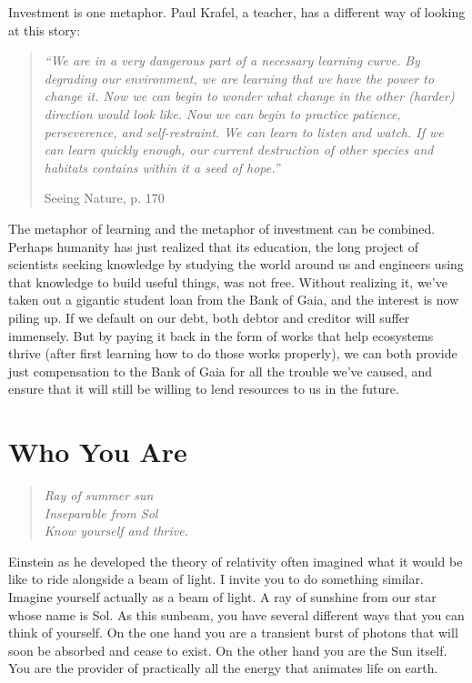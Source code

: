 \documentclass[ebook,11pt,openany,twoside]{memoir}
\newcommand{\tab}{\hspace*{2em}}
\newcommand{\imagefacingchapter}[1]{
  \cleartoverso
  \clearpage \null
  \thispagestyle{cleared}
  \AddToShipoutPictureBG*{%
    \AtStockLowerLeft{%
      \texttt{[image: \#1]}
    }
  }
  \clearpage
}
\begin{document}
Investment is one metaphor. Paul Krafel, a teacher, has a different way of
looking at this story:

\begin{quote}
	\em
	``We are in a very dangerous part of a necessary learning curve. By
degrading our environment, we are learning that we have the power to change it.
Now we can begin to wonder what change in the other (harder) direction would
look like. Now we can begin to practice patience, perseverence, and
self-restraint. We can learn to listen and watch. If we can learn quickly
enough, our current destruction of other species and habitats contains within
it a seed of hope.''

\tab \tab Seeing Nature, p. 170
\end{quote}

The metaphor of learning and the metaphor of investment can be combined.
Perhaps humanity has just realized that its education, the long project of
scientists seeking knowledge by studying the world around us and engineers
using that knowledge to build useful things, was not free. Without realizing
it, we've taken out a gigantic student loan from the Bank of Gaia, and the
interest is now piling up. If we default on our debt, both debtor and creditor
will suffer immensely. But by paying it back in the form of works that help
ecosystems thrive (after first learning how to do those works properly), we can
both provide just compensation to the Bank of Gaia for all the trouble we've
caused, and ensure that it will still be willing to lend resources to us in the
future.

\imagefacingchapter{images/RayOfSummerSun-cropped}
\chapter{Who You Are}

\begin{verse}
\em
Ray of summer sun\\
Inseparable from Sol\\
Know yourself and thrive.
\end{verse}

Einstein as he developed the theory of relativity often imagined what it would
be like to ride alongside a beam of light. I invite you to do something
similar. Imagine yourself actually as a beam of light. A ray of sunshine from
our star whose name is Sol. As this sunbeam, you have several different ways
that you can think of yourself. On the one hand you are a transient burst of
photons that will soon be absorbed and cease to exist. On the other hand you
are the Sun itself. You are the provider of practically all the energy that
animates life on earth.
\end{document}
